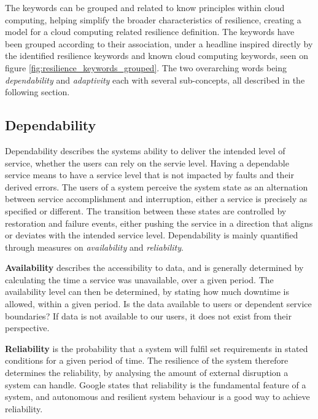 The keywords can be grouped and related to know principles within cloud computing, helping simplify the broader characteristics of resilience, creating a model for a cloud computing related resilience definition. The keywords have been grouped according to their association, under a headline inspired directly by the identified resilience keywords and known cloud computing keywords, seen on figure \ref{fig:resilience_keywords_grouped}. The two overarching words being \textit{dependability} and \textit{adaptivity} each with several sub-concepts, all described in the following section.

\subsection{Dependability}
Dependability describes the systems ability to deliver the intended level of service, whether the users can rely on the servie level. Having a dependable service means to have a service level that is not impacted by faults and their derived errors. The users of a system perceive the system state as an alternation between service accomplishment and interruption, either a service is precisely as specified or different. The transition between these states are controlled by restoration and failure events, either pushing the service in a direction that aligns or deviates with the intended service level. Dependability is mainly quantified through measures on \textit{availability} and \textit{reliability}\cite{laprie1985dependable}.


\textbf{Availability} describes the accessibility to data, and is generally determined by calculating the time a service was unavailable, over a given period. The availability level can then be determined, by stating how much downtime is allowed, within a given period\cite[p. 477]{beyer2016siteReliabilityEngineering}. Is the data available to users or dependent service boundaries? If data is not available to our users, it does not exist from their perspective\cite[p. 345]{beyer2016siteReliabilityEngineering}.


\textbf{Reliability} is the probability that a system will fulfil set requirements in stated conditions for a given period of time. \cite{o2012practical} The resilience of the system therefore determines the reliability, by analysing the amount of external disruption a system can handle. Google states that reliability is the fundamental feature of a system, and autonomous and resilient system behaviour is a good way to achieve reliability\cite[p. 84]{beyer2016siteReliabilityEngineering}.


